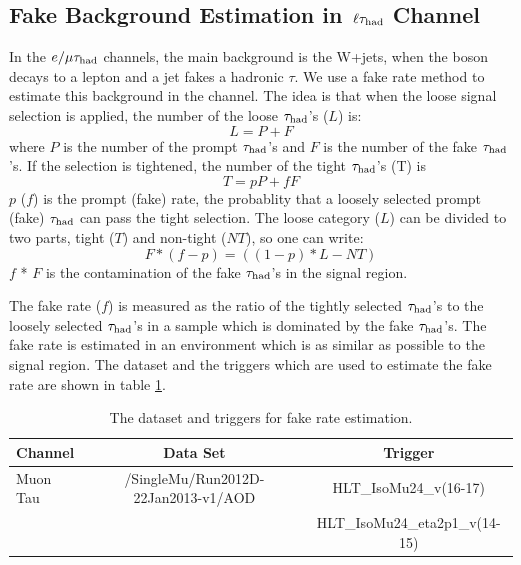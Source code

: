 \subsection{\texorpdfstring{Fake Background Estimation in $\,\ell\tau_{\rm had}$ Channel}{Fake Background Estimation in lepton-tau Channel}}
\label{sect:bkgLeptau}
In the $e/\mu\tau_{\rm had}$ channels, the main background is the W+jets, when the \Wpm boson decays to a lepton and a jet fakes a hadronic $\tau$.
We use a fake rate method to estimate this background \cite{CMS_AN_2010-261} in the \muTau channel.
The idea is that when the loose signal selection is applied, the number of the loose $\tau_{\rm had}$'s ($L$) is:
\begin{equation}
L = P + F
\end{equation}
where $P$ is the number of the  prompt $\tau_{\rm had}$'s and $F$ is the number of the  fake $\tau_{\rm had}$'s. If the selection is tightened, the number of the tight $\tau_{\rm had}$'s (T) is
\begin{equation}
 T = pP + fF
\end{equation} 
$p$ ($f$) is the prompt (fake) rate, the probablity that a loosely selected prompt (fake) $\tau_{\rm had}$ can pass the  tight  selection. The loose category ($L$) can be divided to two parts, 
tight ($T$) and non-tight ($NT$), so one can write:
\begin{equation}
   F * (f - p) = ((1 - p) * L - NT)
\end{equation}
$f$ * $F$ is the contamination of the fake $\tau_{\rm had}$'s in the signal region. 

The fake rate ($f$) is measured as the ratio of the tightly selected $\tau_{\rm had}$'s to the loosely 
selected $\tau_{\rm had}$'s in a sample which is dominated by the fake $\tau_{\rm had}$'s. The fake rate is estimated in an environment which is as similar as possible to 
the signal region. The dataset and the triggers which are used to estimate the fake rate %
are shown in table \ref{Tab.DataFR}.
\begin{table}[!htb]
\begin{center}
\begin{tabular}{|l|c|c|}
\hline
Channel      & Data Set                                     & Trigger \\\hline
Muon Tau     & /SingleMu/Run2012D-22Jan2013-v1/AOD          & HLT\_IsoMu24\_v(16-17)\\
             &                                              & HLT\_IsoMu24\_eta2p1\_v(14-15)\\\hline
\hline
\end{tabular}
\caption{The dataset and triggers for fake rate estimation.}
\label{Tab.DataFR}
\end{center}
\end{table}

